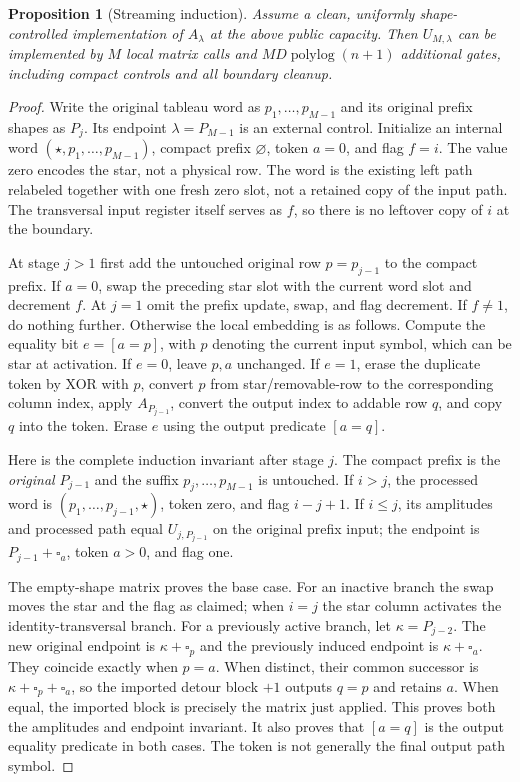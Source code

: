 \documentclass[11pt]{article}
\newtheorem{proposition}[theorem]{Proposition}
\theoremstyle{definition}
\newcommand{\polylog}{\operatorname{polylog}}
\begin{document}
\begin{proposition}[Streaming induction]\label{prop:stream}
Assume a clean, uniformly shape-controlled implementation of $A_\lambda$
at the above public capacity. Then $U_{M,\lambda}$ can be implemented by
$M$ local matrix calls and $MD\polylog(n+1)$ additional gates, including
compact controls and all boundary cleanup.
\end{proposition}
\begin{proof}
Write the original tableau word as $p_1,\ldots,p_{M-1}$ and its original
prefix shapes as $P_j$. Its endpoint $\lambda=P_{M-1}$ is an external
control. Initialize an internal word
$(\star,p_1,\ldots,p_{M-1})$, compact prefix $\varnothing$, token $a=0$,
and flag $f=i$. The value zero encodes the star, not a physical row.
The word is the existing left path relabeled together with one fresh zero
slot, not a retained copy of the input path. The transversal input register
itself serves as $f$, so there is no leftover copy of $i$ at the boundary.

At stage $j>1$ first add the untouched original row $p=p_{j-1}$ to the
compact prefix. If $a=0$, swap the preceding star slot with the current
word slot and decrement $f$. At $j=1$ omit the prefix update, swap,
and flag decrement.
If $f\ne1$, do nothing further. Otherwise the local embedding is as
follows. Compute the equality bit $e=[a=p]$, with $p$ denoting the current
input symbol, which can be star at activation. If $e=0$, leave $p,a$
unchanged. If $e=1$, erase the duplicate token by XOR with $p$, convert
$p$ from star/removable-row to the corresponding column index, apply
$A_{P_{j-1}}$, convert the output index to addable row $q$, and copy $q$
into the token. Erase $e$ using the output predicate $[a=q]$.

Here is the complete induction invariant after stage $j$. The compact
prefix is the \emph{original} $P_{j-1}$ and the suffix $p_j,\ldots,p_{M-1}$
is untouched. If $i>j$, the processed word is
$(p_1,\ldots,p_{j-1},\star)$, token zero, and flag $i-j+1$.
If $i\le j$, its amplitudes and processed path equal
$U_{j,P_{j-1}}$ on the original prefix input; the endpoint is
$P_{j-1}+\square_a$, token $a>0$, and flag one.

The empty-shape matrix proves the base case. For an inactive branch the
swap moves the star and the flag as claimed; when $i=j$ the star column
activates the identity-transversal branch. For a previously active branch,
let $\kappa=P_{j-2}$. The new original endpoint is
$\kappa+\square_p$ and the previously induced endpoint is
$\kappa+\square_a$. They coincide exactly when $p=a$.
When distinct, their common successor is
$\kappa+\square_p+\square_a$, so the imported detour block $+1$ outputs
$q=p$ and retains $a$. When equal, the imported block is precisely the
matrix just applied. This proves both the amplitudes and endpoint invariant.
It also proves that $[a=q]$ is the output equality predicate in both cases.
The token is not generally the final output path symbol.


\end{proof}
\end{document}
